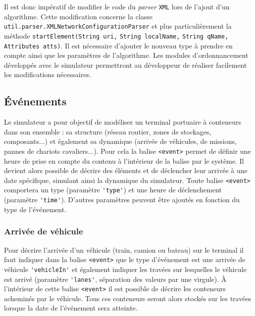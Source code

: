 Il est donc impératif de modifier le code du \textit{parser} \verb!XML! lors de l'ajout d'un algorithme. Cette modification concerne la classe \verb!util.parser.XMLNetworkConfigurationParser! et plus particulièrement la méthode \verb!startElement(String uri,! \verb!String localName,! \verb!String qName,! \verb!Attributes atts)!. Il est nécessaire d'ajouter le nouveau type à prendre en compte ainsi que les paramètres de l'algorithme. Les modules d'ordonnancement développés avec le simulateur permettront au développeur de réaliser facilement les modifications nécessaires.

\subsection{Événements}

Le simulateur a pour objectif de modéliser un terminal portuaire à conteneurs dans son ensemble : sa structure (réseau routier, zones de stockages, composants...) et également sa dynamique (arrivée de véhicules, de missions, pannes de chariots cavaliers...). Pour cela la balise \verb!<event>! permet de définir une heure de prise en compte du contenu à l'intérieur de la balise par le système. Il devient alors possible de décrire des éléments et de déclencher leur arrivée à une date spécifique, simulant ainsi la dynamique du simulateur. Toute balise \verb!<event>! comportera un type (paramètre \verb!'type'!) et une heure de déclenchement (paramètre \verb!'time'!). D'autres paramètres peuvent être ajoutés en fonction du type de l'événement.

\subsubsection{Arrivée de véhicule}

Pour décrire l'arrivée d'un véhicule (train, camion ou bateau) sur le terminal il faut indiquer dans la balise \verb!<event>! que le type d'événement est une arrivée de véhicule \verb!'vehicleIn'! et également indiquer les travées sur lesquelles le véhicule est arrivé (paramètre \verb!'lanes'!, séparation des valeurs par une virgule). À l'intérieur de cette balise \verb!<event>! il est possible de décrire les conteneurs acheminés par le véhicule. Tous ces conteneurs seront alors stockés sur les travées lorsque la date de l'événement sera atteinte.

